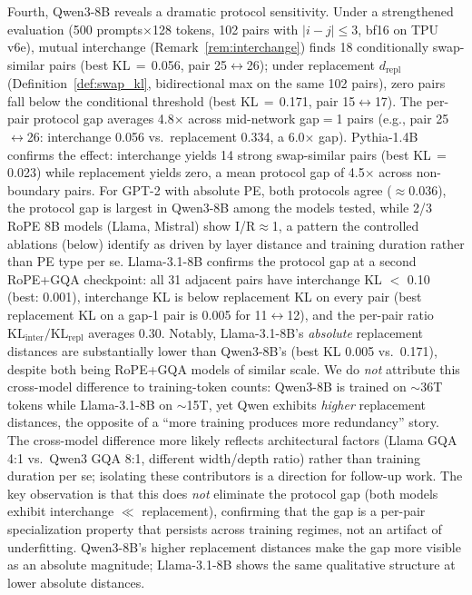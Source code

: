 \documentclass{article}
\begin{document}
Fourth, Qwen3-8B reveals a dramatic protocol sensitivity. Under a strengthened evaluation (500 prompts$\times$128 tokens, 102 pairs with $|i{-}j|{\leq}3$, bf16 on TPU v6e), mutual interchange (Remark~\ref{rem:interchange}) finds 18 conditionally swap-similar pairs (best KL\,$=$\,0.056, pair 25$\leftrightarrow$26); under replacement $d_{\text{repl}}$ (Definition~\ref{def:swap_kl}, bidirectional max on the same 102 pairs), zero pairs fall below the conditional threshold (best KL\,$=$\,0.171, pair 15$\leftrightarrow$17). The per-pair protocol gap averages 4.8$\times$ across mid-network gap$=$1 pairs (e.g., pair 25$\leftrightarrow$26: interchange 0.056 vs.\ replacement 0.334, a 6.0$\times$ gap). Pythia-1.4B confirms the effect: interchange yields 14 strong swap-similar pairs (best KL\,$=$\,0.023) while replacement yields zero, a mean protocol gap of 4.5$\times$ across non-boundary pairs. For GPT-2 with absolute PE, both protocols agree ($\approx$0.036), the protocol gap is largest in Qwen3-8B among the models tested, while 2/3 RoPE 8B models (Llama, Mistral) show I/R$\approx$1, a pattern the controlled ablations (below) identify as driven by layer distance and training duration rather than PE type per se.
Llama-3.1-8B confirms the protocol gap at a second RoPE+GQA checkpoint: all 31 adjacent pairs have interchange KL $<$ 0.10 (best: 0.001), interchange KL is below replacement KL on every pair (best replacement KL on a gap-1 pair is 0.005 for 11$\leftrightarrow$12), and the per-pair ratio $\mathrm{KL}_{\mathrm{inter}}/\mathrm{KL}_{\mathrm{repl}}$ averages 0.30. Notably, Llama-3.1-8B's \emph{absolute} replacement distances are substantially lower than Qwen3-8B's (best KL 0.005 vs.\ 0.171), despite both being RoPE+GQA models of similar scale. We do \textit{not} attribute this cross-model difference to training-token counts: Qwen3-8B is trained on ${\sim}$36T tokens while Llama-3.1-8B on ${\sim}$15T, yet Qwen exhibits \emph{higher} replacement distances, the opposite of a ``more training produces more redundancy'' story. The cross-model difference more likely reflects architectural factors (Llama GQA 4:1 vs.\ Qwen3 GQA 8:1, different width/depth ratio) rather than training duration per se; isolating these contributors is a direction for follow-up work. The key observation is that this does \emph{not} eliminate the protocol gap (both models exhibit interchange $\ll$ replacement), confirming that the gap is a per-pair specialization property that persists across training regimes, not an artifact of underfitting. Qwen3-8B's higher replacement distances make the gap more visible as an absolute magnitude; Llama-3.1-8B shows the same qualitative structure at lower absolute distances.
\end{document}
